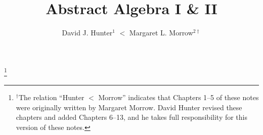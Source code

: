 
%
\usepackage{graphicx}
\usepackage{enumitem}

\usepackage{thmtools}
\theoremstyle{definition}

\usepackage{amscd} %
\usepackage{tikz} %
\usetikzlibrary{shapes.misc}


\newcommand*\notesymbol[1]{\tikz{
            \node[shape=rounded rectangle,fill=yellow!25,draw,inner xsep=2pt, inner ysep=2pt] (char) {#1};}}
\renewcommand{\makeenmark}{\notesymbol{\scriptsize\theenmark}\hspace{3pt}}

\newcommand{\ZZ}{\mathbb{Z}}
\newcommand{\NN}{\mathbb{N}}
\newcommand{\QQ}{\mathbb{Q}}
\newcommand{\RR}{\mathbb{R}}
\newcommand{\CC}{\mathbb{C}}
\newcommand{\FF}{\mathbb{F}}
\DeclareMathOperator{\stab}{stab}
\DeclareMathOperator{\Irr}{Irr}
\DeclareMathOperator{\Gal}{Gal}
\DeclareMathOperator{\Ker}{Ker}

%
\InstructorVersion
%
\newcommand\blfootnote[1]{%
  \begingroup
  \renewcommand\thefootnote{}\footnote{#1}%
  \addtocounter{footnote}{-1}%
  \endgroup
}


\large
\frontmatter
\title{Abstract Algebra I \& II}
\author{David J. Hunter$^1$ $<$ Margaret L. Morrow$^{2\dagger}$}
\blfootnote{$^\dagger$The relation ``Hunter $<$ Morrow'' indicates that Chapters 1--5 of these notes were originally written by Margaret Morrow. David Hunter revised these chapters and added Chapters 6--13, and he takes full responsibility for this version of these notes.}
\maketitle

